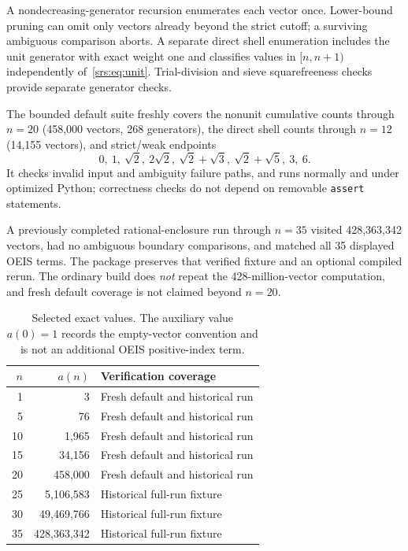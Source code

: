 \documentclass[11pt]{article}
\numberwithin{equation}{section}
\theoremstyle{remark}\newtheorem{remark}[theorem]{Remark}
\begin{document}
A nondecreasing-generator recursion enumerates each vector once. Lower-bound pruning can omit only vectors already beyond the strict cutoff; a surviving ambiguous comparison aborts. A separate direct shell enumeration includes the unit generator with exact weight one and classifies values in $[n,n+1)$ independently of~\eqref{srs:eq:unit}. Trial-division and sieve squarefreeness checks provide separate generator checks.

The bounded default suite freshly covers the nonunit cumulative counts through $n=20$ (458,000 vectors, 268 generators), the direct shell counts through $n=12$ (14,155 vectors), and strict/weak endpoints
\[
0,\ 1,\ \sqrt2,\ 2\sqrt2,\ \sqrt2+\sqrt3,\ \sqrt2+\sqrt5,\ 3,\ 6.
\]
It checks invalid input and ambiguity failure paths, and runs normally and under optimized Python; correctness checks do not depend on removable \texttt{assert} statements.

A previously completed rational-enclosure run through $n=35$ visited 428,363,342 vectors, had no ambiguous boundary comparisons, and matched all 35 displayed OEIS terms. The package preserves that verified fixture and an optional compiled rerun. The ordinary build does \emph{not} repeat the 428-million-vector computation, and fresh default coverage is not claimed beyond $n=20$.

\begin{table}[H]
\centering
\begin{tabular}{@{}r r l@{}}\toprule
$n$ & $a(n)$ & Verification coverage\\\midrule
1 & 3 & Fresh default and historical run\\
5 & 76 & Fresh default and historical run\\
10 & 1,965 & Fresh default and historical run\\
15 & 34,156 & Fresh default and historical run\\
20 & 458,000 & Fresh default and historical run\\
25 & 5,106,583 & Historical full-run fixture\\
30 & 49,469,766 & Historical full-run fixture\\
35 & 428,363,342 & Historical full-run fixture\\\bottomrule
\end{tabular}
\caption{Selected exact values. The auxiliary value $a(0)=1$ records the empty-vector convention and is not an additional OEIS positive-index term.}
\end{table}
\end{document}
